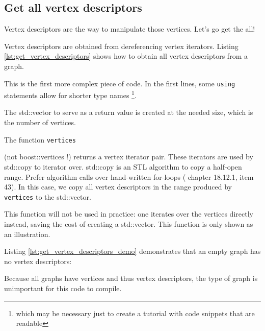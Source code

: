 

\subsection{Get all vertex descriptors}
\label{subsec:get_vertex_descriptors}

Vertex descriptors are the way to manipulate those vertices.
Let's go get the all!

Vertex descriptors are obtained from dereferencing vertex iterators.
Listing \ref{lst:get_vertex_descriptors}
shows how to obtain all vertex descriptors from a graph.



This is the first more complex piece of code.
In the first lines, some \verb;using; statements allow for shorter type names
\footnote{
  which may be necessary just to create a tutorial 
  with code snippets that are readable
}.

The std::vector to serve as a return value is created at the needed size,
which is the number of vertices.

The function \verb;vertices; 

(not boost::vertices !) 
returns a vertex iterator pair.
These iterators are used by std::copy to iterator over.
std::copy 
is an STL algorithm to copy a half-open range.
Prefer algorithm calls over hand-written for-loops (
\cite{stroustrup1997} chapter 18.12.1, 
\cite{meyers2005effective} item 43).
In this case, we copy all vertex descriptors in the range produced 
by \verb;vertices; to the std::vector.

This function will not be used in practice: one iterates over the vertices
directly instead, saving the cost of creating a std::vector.
This function is only shown as an illustration.

Listing \ref{lst:get_vertex_descriptors_demo}
demonstrates that an empty graph has no vertex descriptors:



Because all graphs have vertices and thus vertex descriptors, the type of
graph is unimportant for this code to compile.

